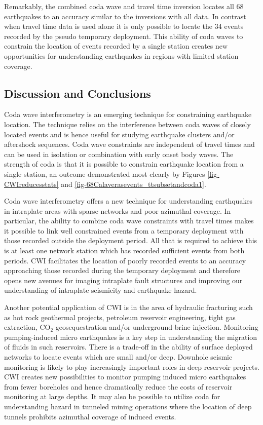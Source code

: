 \documentclass[12pt,double]{article}
\begin{document}
Remarkably, the combined coda wave and travel time inversion locates
all 68 earthquakes to an accuracy similar to the inversions with all
data. In contrast when travel time data is used alone it is only
possible to locate the 34 events recorded by the pseudo temporary
deployment. This
ability of  coda waves to constrain the location of events recorded
by a single station creates new opportunities for understanding
earthquakes in regions with limited station coverage.

\vspace{2em}
\begin{centering}
\section*{Discussion and Conclusions}
\end{centering}

Coda wave interferometry is an emerging technique for constraining
earthquake location. The technique relies on the interference
between coda waves of closely located events and is hence useful for
studying earthquake clusters and/or aftershock sequences. Coda wave
constraints are independent of travel times and can be used in
isolation or combination with early onset body waves. The strength
of coda is that it is possible to constrain earthquake location from
a single station, an outcome demonstrated most clearly by Figures
\ref{fig-CWIreducesstats} and
\ref{fig-68Calaverasevents_ttsubsetandcoda1}.

Coda wave interferometry offers a new technique for understanding
earthquakes in intraplate areas with sparse networks and poor
azimuthal coverage. In particular, the ability to combine coda wave
constraints with travel times makes it possible to link well
constrained events from a temporary deployment with those recorded
outside the deployment period. All that is required to achieve this
is at least one network station which has recorded sufficient events
from both periods. CWI facilitates the location of poorly recorded
events to an accuracy approaching those recorded during the
temporary deployment and therefore opens new avenues for imaging
intraplate fault structures and improving our understanding of
intraplate seismicity and earthquake hazard.

Another potential application of CWI is in the area of hydraulic
fracturing such as hot rock geothermal projects, petroleum reservoir engineering,
tight gas extraction, CO$_2$ geosequestration and/or underground brine injection.
Monitoring pumping-induced micro earthquakes
is a key step in understanding the migration of fluids in such
reservoirs. There is a trade-off in the ability of surface deployed
networks to locate events which are small and/or deep. Downhole
seismic monitoring is likely to play increasingly important roles in
deep reservoir projects. CWI creates new possibilities to monitor
pumping induced micro earthquakes from fewer boreholes and hence
dramatically reduce the costs of reservoir monitoring at large
depths. It may also be possible to utilize coda for understanding
hazard in tunneled mining operations where the location of deep
tunnels prohibits azimuthal coverage of induced events.
\end{document}

